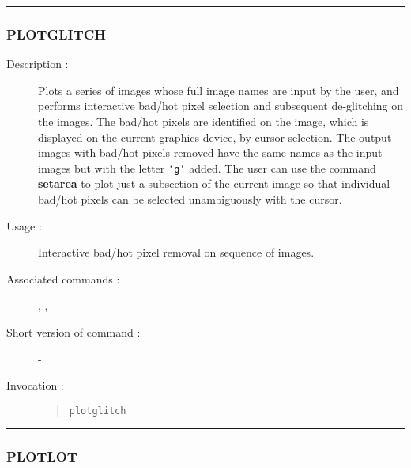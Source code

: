 \hrule
\subsubsection*{\label{PLOTGLITCH}PLOTGLITCH}

\begin{description}

\item[Description :] Plots a series of images whose full image names
are input by the user, and performs interactive bad/hot pixel selection
and subsequent de-glitching on the images.  The bad/hot pixels are
identified on the image, which is displayed on the current graphics
device, by cursor selection.  The output images with bad/hot pixels
removed have the same names as the input images but with the letter {\tt `g'}
added.  The user can use the command {\bf setarea} to plot just a subsection
of the current image so that individual bad/hot pixels can be selected
unambiguously with the cursor.

\item[Usage :] Interactive bad/hot pixel removal on sequence of images.
\item[Associated commands :] {\tt {}},
{\tt {}}, {\tt {}}
\item[Short version of command :] -
\item[Invocation :]

\begin{quote}{\tt  plotglitch }\end{quote}

\end{description}

\hrule
\subsubsection*{\label{PLOTLOT}PLOTLOT}

